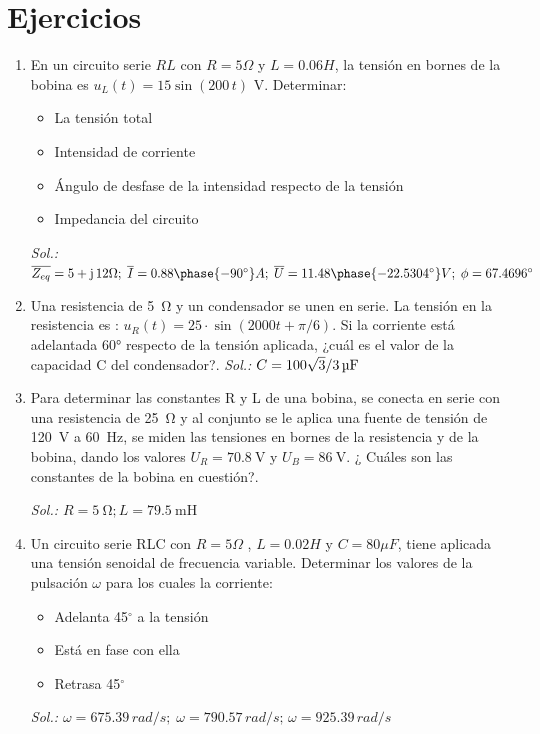 \section{Ejercicios}
	
\begin{enumerate}
		
\item En un circuito serie $RL$ con $R=5\Omega$ y $L=0.06H$, la
  tensión en bornes de la bobina es $u_L(t)=15\sin(200\,t)$
  V. Determinar:
  \begin{itemize}
  \item La tensión total
  \item Intensidad de corriente
  \item Ángulo de desfase de la intensidad respecto de la tensión
  \item Impedancia del circuito
  \end{itemize}
  \emph{Sol.:
    $\overline{Z_{eq}}=5+\mathrm{j}\,12\Omega;\;\overline{I}=0.88\phase{-90^\circ}A;\;\overline{U}=11.48\phase{-22.5304^\circ}
    V;\; \phi=67.4696^\circ$}

\item Una resistencia de \qty{5}{\ohm} y un condensador se unen en
  serie. La tensión en la resistencia es :
  $u_R(t) = 25 \cdot \sin(2000t + \pi/6)$. Si la corriente está
  adelantada \ang{60} respecto de la tensión aplicada, ¿cuál es el
  valor de la capacidad C del condensador?.  \emph{Sol.:
    $C = \SI[parse-numbers = false]{100\sqrt{3}/3}{\micro\farad}$}
  

\item Para determinar las constantes R y L de una bobina, se conecta
  en serie con una resistencia de \qty{25}{\ohm} y al conjunto se le
  aplica una fuente de tensión de \qty{120}{\volt} a \qty{60}{\hertz},
  se miden las tensiones en bornes de la resistencia y de la bobina,
  dando los valores $U_R = \qty{70.8}{\volt}$ y
  $U_B = \qty{86}{\volt}$. ¿ Cuáles son las constantes de la bobina en
  cuestión?.

  \emph{Sol.: $R = \qty{5}{\ohm}; L = \qty{79.5}{\milli\henry}$}

\item Un circuito serie RLC con $R = {5}{\Omega}$ , $L = {0.02}{H}$ y
  $C={80}{\mu F}$, tiene aplicada una tensión senoidal de frecuencia
  variable. Determinar los valores de la pulsación $\omega$ para los
  cuales la corriente:
  \begin{itemize}
  \item Adelanta {45}{$^\circ$} a la tensión
  \item Está en fase con ella
  \item Retrasa {45}{$^\circ$}
  \end{itemize}
  \emph{Sol.:
    $\omega=675.39\,rad/s;\; \omega=790.57\,rad/s;\,
    \omega=925.39\,rad/s$}


\end{enumerate}
